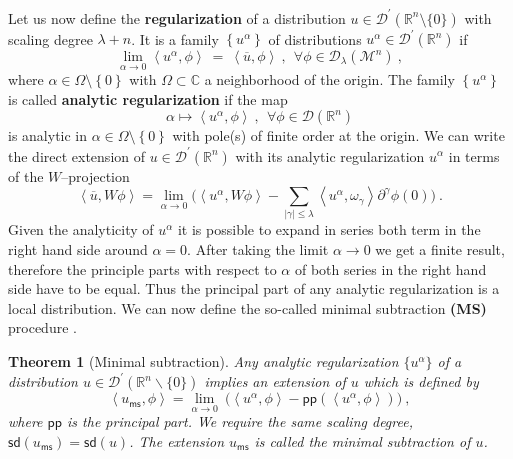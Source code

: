 \documentclass[11pt]{book}
\newcommand{\pp}{\mathsf{pp}}
\newcommand{\ms}{\mathsf{ms}}
\newcommand{\sd}{\mathsf{sd}}
\newcommand{\abs}[1]{\left|#1\right|}
\newcommand{\sm}[1]{\left\langle#1\right\rangle}
\newcommand{\Dcal}{\mathcal{D}}
\newcommand{\Mcal}{\mathcal{M}}
\newcommand{\Rbb}{\mathbb{R}}
\theoremstyle{break}
\newtheorem{theorem}{Theorem}[chapter]
\begin{document}
Let us now define the \textbf{regularization} of a distribution $u \in \Dcal^\prime(\Rbb^n\setminus \{0\})$ with scaling degree $\lambda+n$. It is a family $\left\{ u^{\alpha}\right\}$ of distributions $u^{\alpha}\in\Dcal^\prime(\Rbb^n)$ if
%
\begin{equation*}
\lim_{\alpha \to 0} \sm{u^{\alpha},\phi} \ = \ \sm{\overline{u},\phi} \ , \ \ \forall \phi \in \Dcal_{\lambda}(\Mcal^n) \ , 
\end{equation*}
%
where $\alpha \in \Omega\setminus\left\{ 0\right\}$ with $\Omega\subset\mathbb{C}$ a neighborhood of the origin. The family $\left\{ u^{\alpha}\right\}$ is called \textbf{analytic regularization} if the map 
% 
\begin{equation*}
\alpha \mapsto \sm{u^{\alpha},\phi} \ , \ \ \forall \phi \in \Dcal(\Rbb^n)
\end{equation*}
%
is analytic in $\alpha\in\Omega\setminus\left\{ 0\right\}$ with pole(s) of finite order at the origin. We can write the direct extension of $u\in\Dcal^\prime(\Rbb^n)$ with its analytic regularization $u^\alpha$ in terms of the $W$--projection
%
\begin{equation*}
\sm{\overline{u} , W \phi} = \lim_{\alpha \to 0} \bigg( \sm{u^\alpha , W \phi} -  \sum_{\abs{\gamma}\leq\lambda} \sm{ u^\alpha , \omega_\gamma } \partial^\gamma \phi(0) \bigg) \ .
\end{equation*}
% 
Given the analyticity of $u^\alpha$ it is possible to expand in series both term in the right hand side around $\alpha=0$. After taking the limit $\alpha \to 0$ we get a finite result, therefore the principle parts with respect to $\alpha$ of both series in the right hand side have to be equal. Thus the principal part of any analytic regularization is a local distribution. We can now define the so-called minimal subtraction \textbf{(MS)} procedure \cite{duetsch_dimensional_2014}.


\begin{theorem}[Minimal subtraction]\label{theo:ms_mumeric}
Any analytic regularization $\{u^\alpha\}$ of a distribution $u \in \Dcal^\prime(\Rbb^n \backslash \{0\})$ implies an extension of $u$ which is defined by 
%
\begin{equation*}
\sm{u_\ms,\phi} = \lim_{\alpha \to 0} \ \bigg( \sm{u^\alpha , \phi} - \pp\left(\sm{u^\alpha , \phi}\right) \bigg) \ ,
\end{equation*}
%
where $\pp$ is the principal part. We require the same scaling degree, $\sd(u_\ms) = \sd(u)$. The extension $u_\ms$ is called the minimal subtraction of $u$.
\end{theorem}
\end{document}
